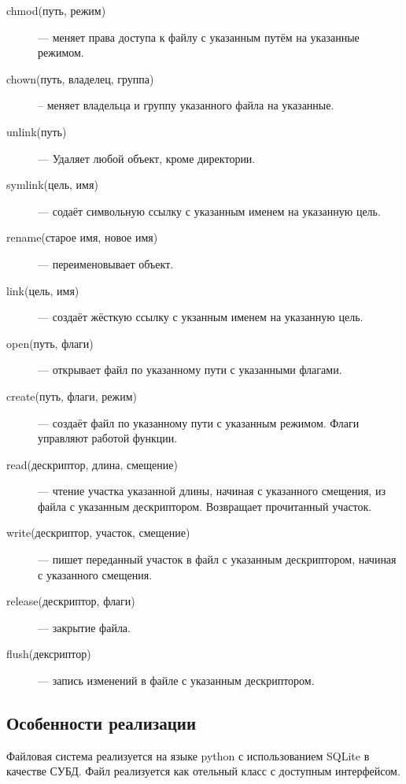 \documentclass[pdftex,a4paper,11pt]{article}
\begin{document}
\begin{description}
\item[chmod(путь, режим)] --- меняет права доступа к файлу с указанным путём на указанные режимом.

\item[chown(путь, владелец, группа)] -- меняет владельца и группу указанного файла на указанные.

\item[unlink(путь)] --- Удаляет любой объект, кроме директории.

\item[symlink(цель, имя)] --- содаёт символьную ссылку с указанным именем на указанную цель.

\item[rename(старое имя, новое имя)] --- переименовывает объект.

\item[link(цель, имя)] --- создаёт жёсткую ссылку с укзанным именем на указанную цель.

\item[open(путь, флаги)] --- открывает файл по указанному пути с указанными флагами.

\item[create(путь, флаги, режим)] --- создаёт файл по указанному пути с указанным режимом. Флаги управляют работой функции.

\item[read(дескриптор, длина, смещение)] --- чтение участка указанной длины, начиная с указанного смещения, из файла с указанным дескриптором. Возвращает прочитанный участок.

\item[write(дескриптор, участок, смещение)] --- пишет переданный участок в файл с указанным дескриптором, начиная с указанного смещения.

\item[release(дескриптор, флаги)] --- закрытие файла.

\item[flush(дексриптор)] --- запись изменений в файле с указанным дескриптором.
\end{description}

\subsection{Особенности реализации}

Файловая система реализуется на языке python с использованием SQLite в качестве СУБД. Файл реализуется как отельный класс с доступным интерфейсом.
\end{document}
